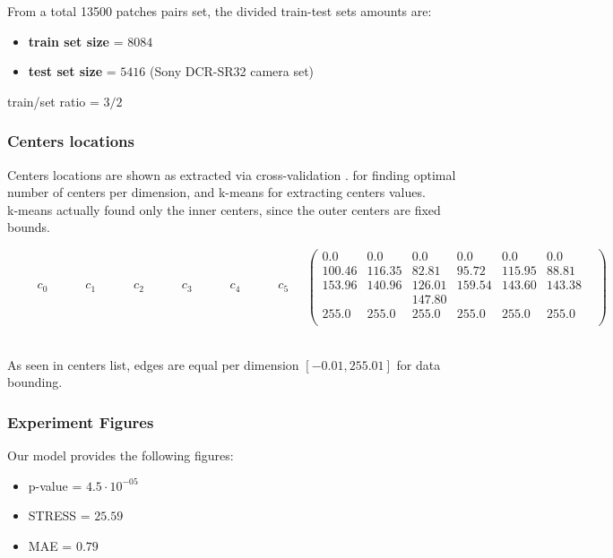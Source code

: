		From a total 13500 patches pairs set, the divided train-test sets amounts are:
		\begin{itemize}
			\item \textbf{train set size} = $8084$ 
			\item \textbf{test set size} = $5416$ (Sony DCR-SR32 camera set)
		\end{itemize}
		
		train/set ratio = $3/2$

	\subsubsection{Centers locations}
	
	Centers locations are shown as extracted via cross-validation \cite{cross_val}. for finding optimal number of centers per dimension, and k-means for extracting centers values. \\
	k-means actually found only the inner centers, since the outer centers are fixed bounds.


	$
	\begin{matrix}  \qquad  c_0 \quad  \qquad c_1 \quad  \qquad c_2 \qquad \quad  c_3 \qquad \quad c_4 \qquad \quad c_5 \quad \end{matrix}
			
	
	\begin{pmatrix}
			     0.0 &     0.0 &    0.0 & 0.0   & 0.0   & 0.0    \\
				100.46 &   116.35 &    82.81 &    95.72 & 115.95 & 88.81     \\
				153.96 &   140.96 &   126.01 &   159.54 & 143.60 & 143.38    \\
				       &          &   147.80 &          &        &             \\
	     		 255.0 &  255.0 &   255.0 &   255.0 &  255.0 &  255.0 & \\
			\end{pmatrix}
	$ 
\\
$ $
	

	As seen in centers list, edges are equal per dimension $[-0.01 , 255.01]$ for data bounding.\\
	
	\subsubsection{Experiment Figures}	
	Our model provides the following figures:	
	\begin{itemize}
	\item 	p-value = $4.5 \cdot 10 ^{-05}$
	\item 	STRESS = $25.59$
	\item 	MAE = $0.79$
	
	\end{itemize}

